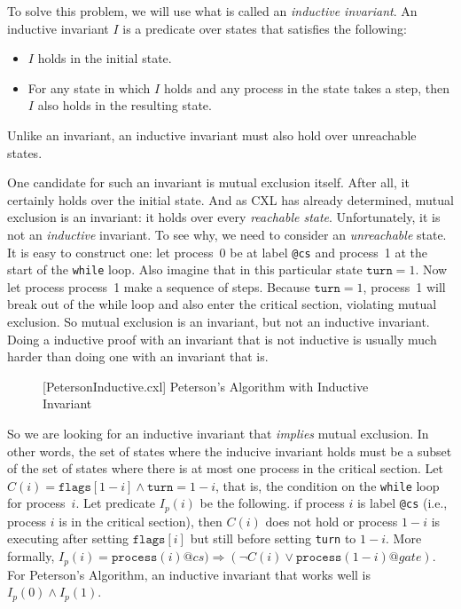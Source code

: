 \documentclass{report}
\newenvironment{code}{
\tcolorbox
}{
\endtcolorbox
}
\begin{document}
To solve this problem, we will use what is called an
\emph{inductive invariant}.
An inductive invariant $I$ is a predicate over states that satisfies the following:
\begin{itemize}
\item $I$ holds in the initial state.
\item For any state in which $I$ holds and any process in the
state takes a step, then $I$ also holds in the resulting state.
\end{itemize}
Unlike an invariant, an inductive invariant must also hold over unreachable states.

One candidate for such an invariant is mutual exclusion itself.
After all, it certainly holds over the initial state.
And as CXL has already determined, mutual exclusion is an invariant:
it holds over every \emph{reachable state}.
Unfortunately, it is not an \emph{inductive} invariant.
To see why, we need to consider an \emph{unreachable} state.
It is easy to construct one: let process~0 be at label \texttt{@cs}
and process~1 at the start of the \texttt{while} loop.
Also imagine that in this particular state $\mathtt{turn} = 1$.  Now let
process process~1 make a sequence of steps.  Because $\mathtt{turn} = 1$,
process~1 will break out of the while loop and also enter the critical
section, violating mutual exclusion.
So mutual exclusion is an invariant, but not an inductive invariant.
Doing a inductive proof with an invariant that is not inductive is usually
much harder than doing one with an invariant that is.

\begin{figure}
\begin{code}
\end{code}
\caption{[PetersonInductive.cxl] Peterson's Algorithm with Inductive Invariant}
\label{fig:petersonproof}
\end{figure}

So we are looking for an inductive invariant that \emph{implies} mutual
exclusion.  In other words, the set of states where the inducive invariant holds
must be a subset of the set of states where there is at most one process in
the critical section.
Let $C(i) = \mathtt{flags}[1 - i] \land
\mathtt{turn} = 1 - i$, that is, the condition on the \texttt{while} loop
for process~$i$.
Let predicate $I_p(i)$ be the following.
if process $i$ is label \texttt{@cs} (i.e., process $i$ is in the critical section),
then $C(i)$ does not hold or process $1-i$ is executing after setting
$\mathtt{flags}[i]$ but still before setting \texttt{turn} to $1-i$.
More formally, $I_p(i) = \mathtt{process}(i)@cs) \Rightarrow (\lnot C(i) \lor \mathtt{process}(1-i)@gate)$.
For Peterson's Algorithm, an inductive invariant that works well is
$I_p(0) \land I_p(1)$.
\end{document}
